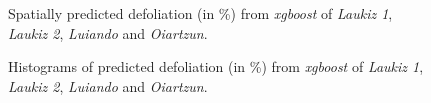 \documentclass[review]{elsarticle}
\begin{document}
\begin{figure} [t!]
	\begin{center}
		\caption{Spatially predicted defoliation (in \%) from \textit{xgboost} of \textit{Laukiz 1}, \textit{Laukiz 2}, \textit{Luiando} and \textit{Oiartzun}.}
		\label{fig:pred_demon_plots}
	\end{center}
\end{figure}

\begin{figure} [t!]
	\begin{center}
		\caption{Histograms of predicted defoliation (in \%) from \textit{xgboost} of \textit{Laukiz 1}, \textit{Laukiz 2}, \textit{Luiando} and \textit{Oiartzun}.}
		\label{fig:pred_demon_plots_hists}
	\end{center}
\end{figure}
\end{document}
